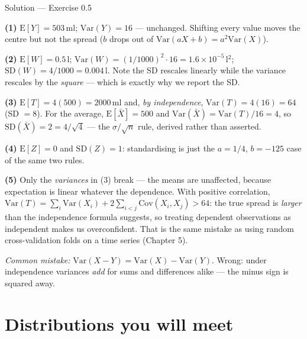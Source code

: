 \documentclass[aspectratio=169,11pt]{beamer}
\begin{document}
\begin{frame}{Solution --- Exercise 0.5}
  \begin{solutionbox}
    \textbf{(1)} $\mathrm{E}[Y] = 503$\,ml; $\mathrm{Var}(Y) = 16$ ---
    unchanged. Shifting every value moves the centre but not the spread
    ($b$ drops out of $\mathrm{Var}(aX+b) = a^2\mathrm{Var}(X)$).

    \textbf{(2)} $\mathrm{E}[W] = 0.5$\,l;
    $\mathrm{Var}(W) = (1/1000)^2 \cdot 16 = 1.6\times10^{-5}$\,l$^2$;
    $\mathrm{SD}(W) = 4/1000 = 0.004$\,l. Note the SD rescales linearly while
    the variance rescales by the \emph{square} --- which is exactly why we
    report the SD.

    \textbf{(3)} $\mathrm{E}[T] = 4(500) = 2000$\,ml and, \emph{by
    independence}, $\mathrm{Var}(T) = 4(16) = 64$ (SD $= 8$).
    For the average, $\mathrm{E}[\bar X] = 500$ and
    $\mathrm{Var}(\bar X) = \mathrm{Var}(T)/16 = 4$, so
    $\mathrm{SD}(\bar X) = 2 = 4/\sqrt{4}$ --- the $\sigma/\sqrt n$ rule,
    derived rather than asserted.

    \textbf{(4)} $\mathrm{E}[Z] = 0$ and $\mathrm{SD}(Z) = 1$: standardising
    is just the $a = 1/4$, $b = -125$ case of the same two rules.

    \textbf{(5)} Only the \emph{variances} in (3) break --- the means are
    unaffected, because expectation is linear whatever the dependence. With
    positive correlation, $\mathrm{Var}(T) = \sum_i\mathrm{Var}(X_i) +
    2\sum_{i<j}\mathrm{Cov}(X_i,X_j) > 64$: the true spread is \emph{larger}
    than the independence formula suggests, so treating dependent
    observations as independent makes us overconfident. That is the same
    mistake as using random cross-validation folds on a time series
    (Chapter 5).

    \textit{Common mistake:} $\mathrm{Var}(X-Y) = \mathrm{Var}(X) -
    \mathrm{Var}(Y)$. Wrong: under independence variances \emph{add} for
    sums and differences alike --- the minus sign is squared away.
  \end{solutionbox}
\end{frame}


\section{Distributions you will meet}
\end{document}
